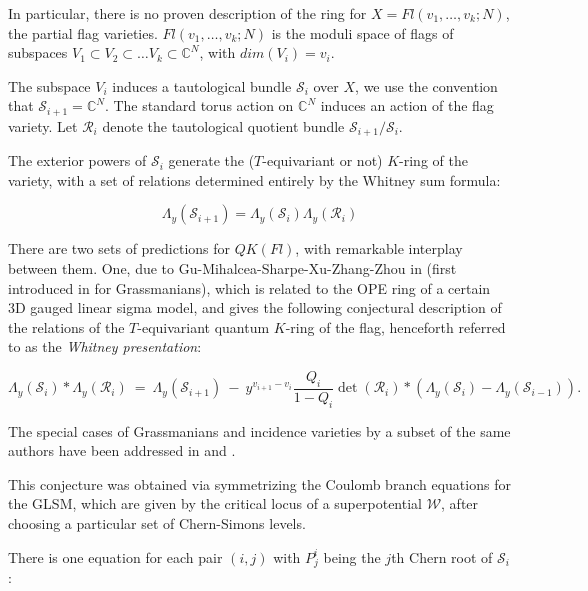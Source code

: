\documentclass[11pt,letterpaper]{amsart}
\begin{document}
In particular, there is no proven description of the ring for $X=Fl(v_1,\dots,v_k;N)$, the partial flag varieties. $Fl(v_1,\dots,v_k;N)$ is the moduli space of flags of subspaces $V_1\subset V_2\subset \dots V_k\subset \mathbb{C}^N$, with $dim(V_i)=v_i$. 

The subspace $V_i$ induces a tautological bundle $\mathcal{S}_i$ over $X$, we use the convention that $\mathcal{S}_{i+1}=\mathbb{C}^N$. The standard torus action on $\mathbb{C}^N$ induces an action of the flag variety. Let $\mathcal{R}_i$ denote the tautological quotient bundle $\mathcal{S}_{i+1}/\mathcal{S}_i$. 

The exterior powers of $\mathcal{S}_i$ generate the ($T$-equivariant or not) $K$-ring of the variety, with a set of relations determined entirely by the Whitney sum formula:

\begin{equation*}
\Lambda_y(\mathcal{S}_{i+1})=\Lambda_y(\mathcal{S}_i)\Lambda_y(\mathcal{R}_i)
\end{equation*}



There are two sets of predictions for $QK(Fl)$, with remarkable interplay between them. One, due to Gu-Mihalcea-Sharpe-Xu-Zhang-Zhou in \cite{conjpf} (first introduced in \cite{conj} for Grassmanians), which is related to the OPE ring of a certain 3D gauged linear sigma model, and gives the following conjectural description of the relations of the $T$-equivariant quantum $K$-ring of the flag, henceforth referred to as the \emph{Whitney presentation}:
\begin{conj}
    \label{whitconj}

\begin{equation}
\Lambda_y(\mathcal{S}_i) * \Lambda_y( \mathcal{R}_i)
\: = \:
\Lambda_y( \mathcal{S}_{i+1}) \: - \:
y^{v_{i+1}-v_i} \frac{Q_i}{1-Q_i} \det(\mathcal{R}_i) *
\left( \Lambda_y(\mathcal{S}_i) - \Lambda_y(\mathcal{S}_{i-1}) \right).
\end{equation}
\end{conj}
 The special cases of Grassmanians and incidence varieties by a subset of the same authors have been addressed in \cite{conj} and \cite{qwhit}. 


This conjecture was obtained via symmetrizing the Coulomb branch equations for the GLSM, which are given by the critical locus of a superpotential $\mathcal{W}$, after choosing a particular set of Chern-Simons levels. 

 There is one equation for each pair $(i,j)$ with $P^i_{j}$ being the $j$th Chern root of $\mathcal{S}_i$:
\end{document}
